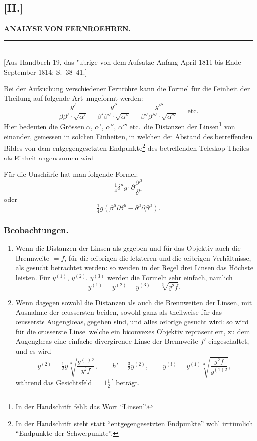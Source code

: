 \documentclass[12pt,a4paper]{article}
\theoremstyle{plain}
\theoremstyle{definition}
\theoremstyle{remark}
\begin{document}
\subsection*{[II.]}
\begin{center}
\textbf{ANALYSE VON FERNROEHREN.}
\end{center}
\begin{center}
\rule{6cm}{0.4pt}\\[4pt]
[Aus Handbuch 19, das "ubrige von dem Aufsatze Anfang April 1811 bis
Ende September 1814; S.~38--41.]
\end{center}

Bei der Aufsuchung verschiedener Fernr\"ohre kann die Formel f\"ur die
Feinheit der Theilung auf folgende Art umgeformt werden:
\[
\frac{g'}{\beta\beta'\cdot\sqrt{\alpha'}} =
\frac{g''}{\beta'\beta''\cdot\sqrt{\alpha''}} =
\frac{g'''}{\beta''\beta'''\cdot\sqrt{\alpha'''}} = \text{etc.}
\]
Hier bedeuten die Gr\"ossen $\alpha$, $\alpha'$, $\alpha''$, $\alpha'''$
etc.~die Distanzen der Linsen\footnote{In der Handschrift fehlt das
Wort ``Linsen''.} von einander, gemessen in solchen Einheiten, in
welchen der Abstand des betreffenden Bildes von dem entgegengesetzten
Endpunkte\footnote{In der Handschrift steht statt ``entgegengesetzten
Endpunkte'' wohl irrt\"umlich ``Endpunkte der Schwerpunkte''.} des
betreffenden Teleskop-Theiles als Einheit angenommen wird.

F\"ur die Unsch\"arfe hat man folgende Formel:
\[
\tfrac{1}{4}\delta^{\mu}g\cdot\partial\frac{\beta^{\mu}}{\delta^{\mu}}
\]
oder
\[
\tfrac{1}{4}g\left(\beta^{\mu}\partial\delta^{\mu}
- \delta^{\mu}\partial\beta^{\mu}\right).
\]

\subsubsection*{Beobachtungen.}
\begin{enumerate}
\item Wenn die Distanzen der Linsen als gegeben und f\"ur das Objektiv
auch die Brennweite $= f$, f\"ur die \oe ibrigen die letzteren und die
\oe ibrigen Verh\"altnisse, als gesucht betrachtet werden: so werden in
der Regel drei Linsen das H\"ochste leisten. F\"ur $y^{(1)}$, $y^{(2)}$,
$y^{(3)}$ werden die Formeln sehr einfach, n\"amlich
\[
y^{(1)} = y^{(2)} = y^{(3)} = \sqrt[3]{y^{2}f}.
\]

\item Wenn dagegen sowohl die Distanzen als auch die Brennweiten der
Linsen, mit Ausnahme der \oe ussersten beiden, sowohl ganz als
theilweise f\"ur das \oe usserste Augengl\oe as, gegeben sind, und
alles \oe ibrige gesucht wird: so wird f\"ur die \oe usserste Linse,
welche ein biconvexes Objektiv repr\"asentiert, zu dem Augengl\oe as
eine einfache divergirende Linse der Brennweite $f'$ eingeschaltet, und
es wird
\[
y^{(2)} = \tfrac{1}{2}y\sqrt[3]{\frac{y^{(1)2}}{y^{2}f}},\qquad
h' = \tfrac{3}{2}y^{(2)},\qquad
y^{(3)} = y^{(1)}\sqrt[3]{\frac{y^{2}f}{y^{(1)2}}},
\]
w\"ahrend das Gesichtsfeld $= 1\frac{1}{2}\,^{\prime}$ betr\"agt.
\end{enumerate}
\end{document}
